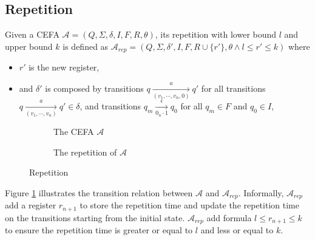 \documentclass[sigconf]{acmart}
\newcommand*{\red}[1]{\textcolor{red}{#1}}
\newcommand*{\aut}{\mathcal{A}}
\begin{document}
\subsection{Repetition}\label{subsec:rep}
Given a CEFA $\aut = (Q,\Sigma,\delta,I,F,R,\theta)$, its repetition with lower bound $l$ and upper bound $k$  is defined as $\aut_{rep} = (Q, \Sigma, \delta', I, F, R\cup\{r'\}, \theta\wedge l\leq r'\leq k )$ where
\begin{itemize}
  \item $r'$ is the new register,
  \item and $\delta'$ is composed by transitions $q\xrightarrow[(v_1, \cdots, v_n, 0)]{a} q'$ for all transitions $q\xrightarrow[(v_1, \cdots, v_n)]{a} q' \in \delta$, and transitions $q_m\xrightarrow[0_{n}\cdot 1]{\epsilon} q_0$  for all $q_m\in F$ and $q_0\in I$,
\end{itemize}
\begin{figure}[h]
  \begin{subfigure}{0.20\textwidth}
    \centering
    \caption{The CEFA $\aut$}
  \end{subfigure}
  \begin{subfigure}{0.20\textwidth}
    \centering
    \caption{The repetition of $\aut$}
  \end{subfigure}
  \caption{Repetition}
  \label{fig:rep}
\end{figure}
Figure \ref{fig:rep} illustrates the transition relation between $\aut$ and $\aut_{rep}$. Informally, $\aut_{rep}$ add a register $r_{n+1}$ to store the repetition time and update the repetition time on the transitions starting from the initial state. $\aut_{rep}$ add formula $l\leq r_{n+1}\leq k$ to ensure the repetition time is greater or equal to $l$ and less or equal to $k$.
\end{document}
